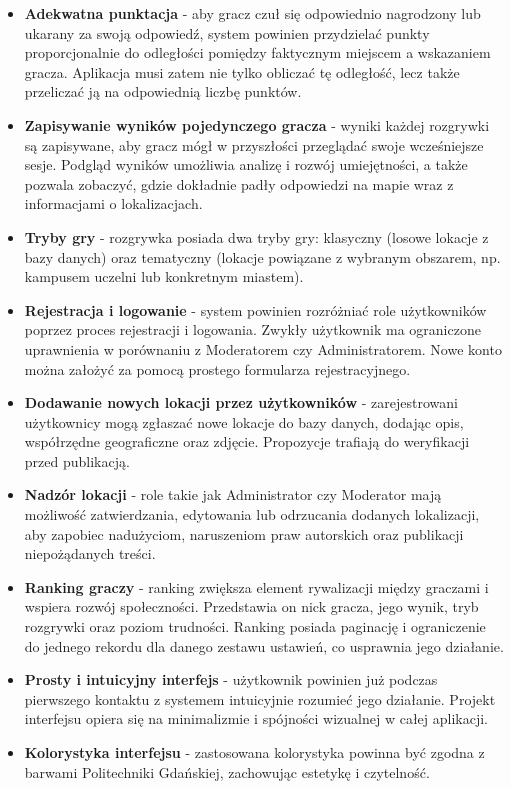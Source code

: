 \begin{itemize}
    \item \textbf{Adekwatna punktacja} - aby gracz czuł się odpowiednio nagrodzony lub ukarany za swoją odpowiedź, system powinien przydzielać punkty proporcjonalnie do odległości pomiędzy faktycznym miejscem a wskazaniem gracza. Aplikacja musi zatem nie tylko obliczać tę odległość, lecz także przeliczać ją na odpowiednią liczbę punktów.
    \item \textbf{Zapisywanie wyników pojedynczego gracza} - wyniki każdej rozgrywki są zapisywane, aby gracz mógł w przyszłości przeglądać swoje wcześniejsze sesje. Podgląd wyników umożliwia analizę i rozwój umiejętności, a także pozwala zobaczyć, gdzie dokładnie padły odpowiedzi na mapie wraz z informacjami o lokalizacjach.
    \item \textbf{Tryby gry} - rozgrywka posiada dwa tryby gry: klasyczny (losowe lokacje z bazy danych) oraz tematyczny (lokacje powiązane z wybranym obszarem, np. kampusem uczelni lub konkretnym miastem).
    \item \textbf{Rejestracja i logowanie} - system powinien rozróżniać role użytkowników poprzez proces rejestracji i logowania. Zwykły użytkownik ma ograniczone uprawnienia w porównaniu z Moderatorem czy Administratorem. Nowe konto można założyć za pomocą prostego formularza rejestracyjnego.
    \item \textbf{Dodawanie nowych lokacji przez użytkowników} - zarejestrowani użytkownicy mogą zgłaszać nowe lokacje do bazy danych, dodając opis, współrzędne geograficzne oraz zdjęcie. Propozycje trafiają do weryfikacji przed publikacją.
    \item \textbf{Nadzór lokacji} - role takie jak Administrator czy Moderator mają możliwość zatwierdzania, edytowania lub odrzucania dodanych lokalizacji, aby zapobiec nadużyciom, naruszeniom praw autorskich oraz publikacji niepożądanych treści.
    \item \textbf{Ranking graczy} - ranking zwiększa element rywalizacji między graczami i wspiera rozwój społeczności. Przedstawia on nick gracza, jego wynik, tryb rozgrywki oraz poziom trudności. Ranking posiada paginację i ograniczenie do jednego rekordu dla danego zestawu ustawień, co usprawnia jego działanie.
    \item \textbf{Prosty i intuicyjny interfejs} - użytkownik powinien już podczas pierwszego kontaktu z systemem intuicyjnie rozumieć jego działanie. Projekt interfejsu opiera się na minimalizmie i spójności wizualnej w całej aplikacji.
    \item \textbf{Kolorystyka interfejsu} - zastosowana kolorystyka powinna być zgodna z barwami Politechniki Gdańskiej, zachowując estetykę i czytelność.

\end{itemize}
